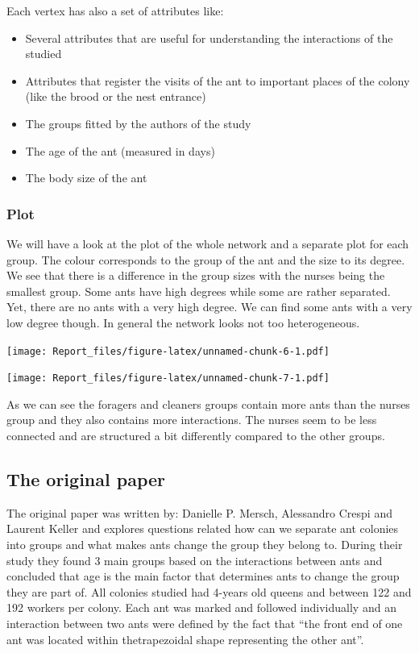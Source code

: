 \documentclass[
]{article}
\begin{document}
Each vertex has also a set of attributes like:

\begin{itemize}
\item
  Several attributes that are useful for understanding the interactions
  of the studied
\item
  Attributes that register the visits of the ant to important places of
  the colony (like the brood or the nest entrance)
\item
  The groups fitted by the authors of the study
\item
  The age of the ant (measured in days)
\item
  The body size of the ant
\end{itemize}

\hypertarget{plot}{%
\subsubsection{Plot}\label{plot}}

We will have a look at the plot of the whole network and a separate plot
for each group. The colour corresponds to the group of the ant and the
size to its degree. We see that there is a difference in the group sizes
with the nurses being the smallest group. Some ants have high degrees
while some are rather separated. Yet, there are no ants with a very high
degree. We can find some ants with a very low degree though. In general
the network looks not too heterogeneous.

\texttt{[image: Report\_files/figure-latex/unnamed-chunk-6-1.pdf]}

\texttt{[image: Report\_files/figure-latex/unnamed-chunk-7-1.pdf]}

As we can see the foragers and cleaners groups contain more ants than
the nurses group and they also contains more interactions. The nurses
seem to be less connected and are structured a bit differently compared
to the other groups.

\hypertarget{the-original-paper}{%
\subsection{The original paper}\label{the-original-paper}}

The original paper was written by: Danielle P. Mersch, Alessandro Crespi
and Laurent Keller and explores questions related how can we separate
ant colonies into groups and what makes ants change the group they
belong to. During their study they found 3 main groups based on the
interactions between ants and concluded that age is the main factor that
determines ants to change the group they are part of. All colonies
studied had 4-years old queens and between 122 and 192 workers per
colony. Each ant was marked and followed individually and an interaction
between two ants were defined by the fact that ``the front end of one
ant was located within thetrapezoidal shape representing the other
ant''.
\end{document}

